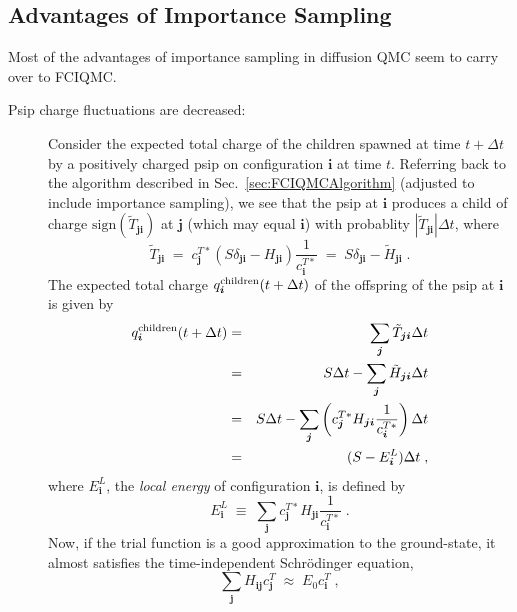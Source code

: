 \documentclass{article}
\newcommand{\bi}{\boldsymbol{i}}
\newcommand{\bj}{\boldsymbol{j}}
\begin{document}
\subsection{Advantages of Importance Sampling}

Most of the advantages of importance sampling in diffusion QMC seem to
carry over to FCIQMC.

\begin{description}

\item[Psip charge fluctuations are decreased:] Consider the expected
  total charge of the children spawned at time $t + \Delta t$ by a
  positively charged psip on configuration $\bi$ at time
  $t$. Referring back to the algorithm described in Sec.\
  \ref{sec:FCIQMCAlgorithm} (adjusted to include importance sampling),
  we see that the psip at $\bi$ produces a child of charge
  $\mbox{sign}(\tilde{T}_{\bj\bi})$ at $\bj$ (which may equal $\bi$)
  with probablity $|\tilde{T}_{\bj\bi}|\Delta t$, where
  \begin{displaymath}
    \tilde{T}_{\bj\bi} \; = \; c_{\bj}^{T\ast} \left ( S
    \delta_{\bj\bi} - H_{\bj\bi} \right ) \frac{1}{c_{\bi}^{T\ast}}
     \; = \; S\delta_{\bj\bi} - \tilde{H}_{\bj\bi}
    \;.
  \end{displaymath}
  The expected total charge $q^{\rm children}_{\bi}(t + \Delta t)$ of
  the offspring of the psip at $\bi$ is given by
  \begin{eqnarray*}
    q_{\bi}^{\rm children}(t + \Delta t) & = &
    \sum_{\bj} \tilde{T}_{\bj\bi}\Delta t \\
    & = & S\Delta t - \sum_{\bj}
    \tilde{H}_{\bj\bi} \Delta t \\
    & = & S\Delta t - \sum_{\bj} \left ( c_{\bj}^{T\ast} H_{\bj\bi}
    \frac{1}{c_{\bi}^{T\ast}} \right ) \Delta t \\
    & = & (S - E^{L}_{\bi})\Delta t \;,
  \end{eqnarray*}
  where $E^{L}_{\bi}$, the \emph{local energy} of configuration $\bi$,
  is defined by
  \begin{displaymath}
    E_{\bi}^{L} \; \equiv \; \sum_{\bj} c_{\bj}^{T\ast} H_{\bj\bi} 
    \frac{1}{c_{\bi}^{T\ast}}\;.
  \end{displaymath}
  Now, if the trial function is a good approximation to the
  ground-state, it almost satisfies the time-independent
  Schr\"{o}dinger equation,
  \begin{displaymath}
    \sum_{\bj} H_{\bi\bj} c_{\bj}^{T} \; \approx \; E_0 c_{\bi}^{T} \;,

\end{displaymath}
\end{description}
\end{document}
